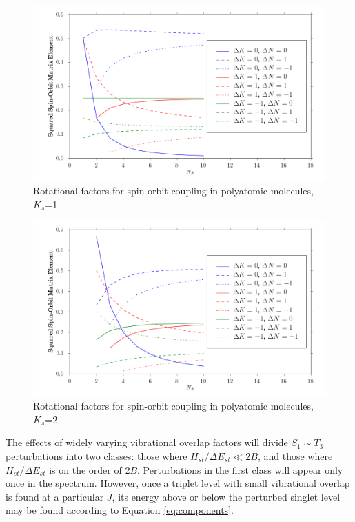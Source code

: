 \documentclass[12pt,draft]{mitthesis}
\begin{document}
\begin{figure}
  \caption{Rotational factors for spin-orbit coupling in polyatomic
    molecules, $K_s$=1}
  \label{fig:rotational-factors-1}
  \centering
  \includegraphics[width=6in]{rotational_factors_k1.png}
\end{figure}

\begin{figure}
  \caption{Rotational factors for spin-orbit coupling in polyatomic
    molecules, $K_s$=2}
  \label{fig:rotational-factors-2}
  \centering
  \includegraphics[width=6in]{rotational_factors_k2.png}
\end{figure}



The effects of widely varying vibrational overlap factors will divide
$S_1 \sim T_3$ perturbations into two classes: those where
$H_{st}/\Delta E_{st} \ll 2B$, and those where $H_{st} / \Delta
E_{st}$ is on the order of $2B$.  Perturbations in the first class
will appear only once in the spectrum.  However, once a triplet level
with small vibrational overlap is found at a particular $J$, its
energy above or below the perturbed singlet level may be found
according to Equation \ref{eq:components}.
\end{document}
